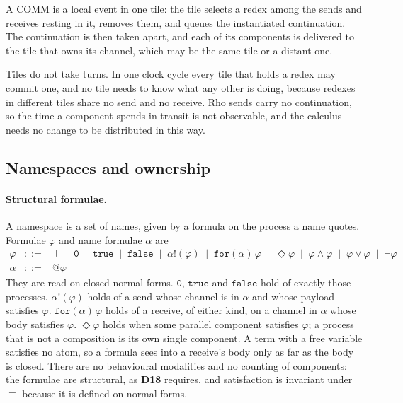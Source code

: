 \documentclass[11pt]{article}
\makeatletter
\newcommand{\kw}[1]{\texttt{#1}}
\newcommand{\nil}{\kw{0}}
\newcommand{\tru}{\kw{true}}
\newcommand{\fls}{\kw{false}}
\newcommand{\quo}[1]{@#1}
\newcommand{\snd}[2]{#1!(#2)}
\newcommand{\scong}{\equiv}
\newcommand{\dec}[1]{\textbf{D#1}}
\theoremstyle{definition}
\theoremstyle{remark}
\makeatother
\begin{document}
A COMM is a local event in one tile: the tile selects a redex among the sends
and receives resting in it, removes them, and queues the instantiated
continuation. The continuation is then taken apart, and each of its
components is delivered to the tile that owns its channel, which may be the
same tile or a distant one.

Tiles do not take turns. In one clock cycle every tile that holds a redex may
commit one, and no tile needs to know what any other is doing, because
redexes in different tiles share no send and no receive. Rho sends carry no
continuation, so the time a component spends in transit is not observable,
and the calculus needs no change to be distributed in this way.

\subsection{Namespaces and ownership}\label{sec:namespaces}

\paragraph{Structural formulae.} A namespace is a set of names, given by a
formula on the process a name quotes. Formulae $\varphi$ and name formulae
$\alpha$ are
\[
\begin{array}{rcl}
\varphi &::=& \top \;\mid\; \nil \;\mid\; \tru \;\mid\; \fls \;\mid\;
  \snd{\alpha}{\varphi} \;\mid\; \kw{for}(\alpha)\,\varphi \;\mid\;
  \Diamond\varphi \;\mid\; \varphi \wedge \varphi \;\mid\; \varphi \vee \varphi
  \;\mid\; \neg\varphi\\[2pt]
\alpha &::=& \quo{\varphi}
\end{array}
\]
They are read on closed normal forms. $\nil$, $\tru$ and $\fls$ hold of
exactly those processes. $\snd{\alpha}{\varphi}$ holds of a send whose channel
is in $\alpha$ and whose payload satisfies $\varphi$.
$\kw{for}(\alpha)\,\varphi$ holds of a receive, of either kind, on a channel
in $\alpha$ whose body satisfies $\varphi$. $\Diamond\varphi$ holds when some
parallel component satisfies $\varphi$; a process that is not a composition
is its own single component. A term with a free variable satisfies no atom,
so a formula sees into a receive's body only as far as the body is closed.
There are no behavioural modalities and no counting of components: the
formulae are structural, as \dec{18} requires, and satisfaction is invariant
under $\scong$ because it is defined on normal forms.
\end{document}
